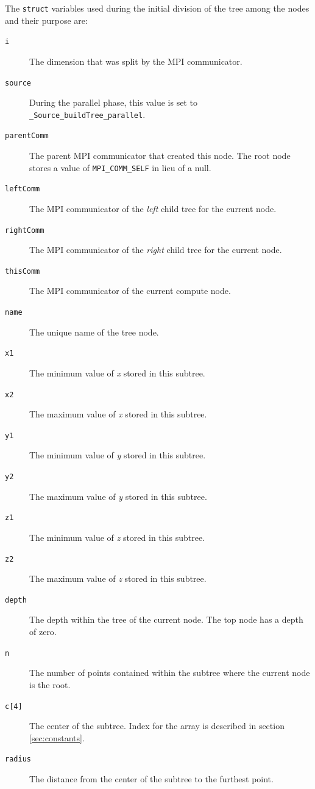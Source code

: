\documentclass{article}
\begin{document}
The \texttt{struct} variables used during the initial division of the tree among the nodes and their purpose are:

\begin{description}
    \item[\texttt{i}]{The dimension that was split by the MPI communicator.}
    \item[\texttt{source}]{During the parallel phase, this value is set to \texttt{\_Source\_buildTree\_parallel}.}
    \item[\texttt{parentComm}]{The parent MPI communicator that created this node. The root node stores a value of \texttt{MPI\_COMM\_SELF} in lieu of a null.}
    \item[\texttt{leftComm}]{The MPI communicator of the \textit{left} child tree for the current node.}
    \item[\texttt{rightComm}]{The MPI communicator of the \textit{right} child tree for the current node.}
    \item[\texttt{thisComm}]{The MPI communicator of the current compute node.}
    \item[\texttt{name}]{The unique name of the tree node.}
    \item[\texttt{x1}]{The minimum value of \textit{x} stored in this subtree.}
    \item[\texttt{x2}]{The maximum value of \textit{x} stored in this subtree.}
    \item[\texttt{y1}]{The minimum value of \textit{y} stored in this subtree.}
    \item[\texttt{y2}]{The maximum value of \textit{y} stored in this subtree.}
    \item[\texttt{z1}]{The minimum value of \textit{z} stored in this subtree.}
    \item[\texttt{z2}]{The maximum value of \textit{z} stored in this subtree.}
    \item[\texttt{depth}]{The depth within the tree of the current node. The top node has a depth of zero.}
    \item[\texttt{n}]{The number of points contained within the subtree where the current node is the root.}
    \item[\texttt{c[4]}]{The center of the subtree. Index for the array is described in section \ref{sec:constants}.}
    \item[\texttt{radius}]{The distance from the center of the subtree to the furthest point.}
\end{description}
\end{document}
